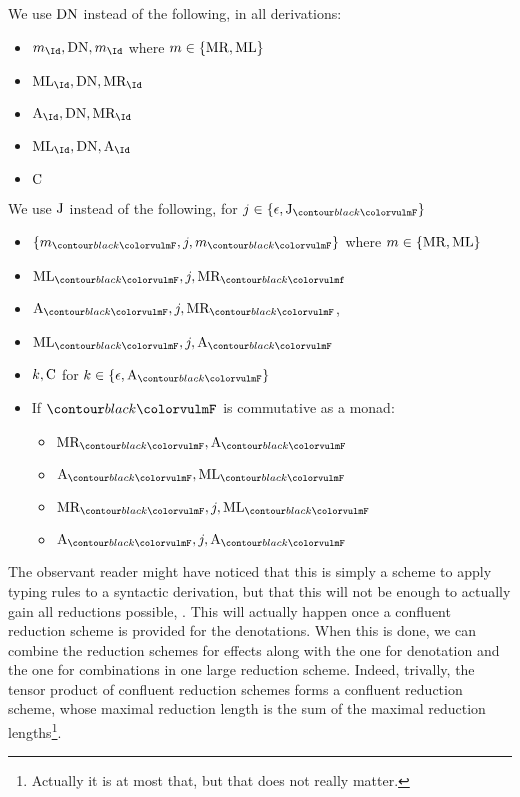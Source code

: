 \noindent We use $\text{DN}$ instead of the following, in all derivations:
\begin{multicols}{2}
	\begin{itemize}
		\item $m_{\Id}, \combDN, m_{\Id}$ where
		      $m \in \{\text{MR}, \text{ML}\}$
		\item $\combML_{\Id}, \combDN, \combMR_{\Id}$
		\item $\combA_{\Id}, \combDN, \combMR_{\Id}$
		\item $\combML_{\Id}, \combDN, \combA_{\Id}$
		\item $\text{C}$
	\end{itemize}
\end{multicols}
\noindent We use $\text{J}$ instead of the following,
for $j \in \{\epsilon, \combJ_{\f{F}}\}$
\begin{multicols}{2}
	\begin{itemize}
		\item $\left\{m_{\f{F}}, j, m_{\f{F}}\right\}$ where
		      $m \in \{\text{MR}, \text{ML}\}$
		\item $\combML_{\f{F}}, j, \combMR_{\f{f}}$
		\item $\combA_{\f{F}}, j, \combMR_{\f{F}}$,
		\item $\combML_{\f{F}}, j, \combA_{\f{F}}$
		\item $k, \text{C}$ for $k \in \{\epsilon, \combA_{\f{F}}\}$
		\item If $\f{F}$ is commutative as a monad:
		      \begin{itemize}
			      \item $\combMR_{\f{F}}, \combA_{\f{F}}$
			      \item $\combA_{\f{F}}, \combML_{\f{F}}$
			      \item $\combMR_{\f{F}}, j, \combML_{\f{F}}$
			      \item $\combA_{\f{F}}, j, \combA_{\f{F}}$
		      \end{itemize}
	\end{itemize}
\end{multicols}

\medskip

The observant reader might have noticed that this is simply a scheme to apply
typing rules to a syntactic derivation, but that this will not be enough to
actually gain all reductions possible, .
This will actually happen once a confluent reduction scheme is provided for the
denotations.
When this is done, we can combine the reduction schemes for effects along with
the one for denotation and the one for combinations in one large reduction
scheme.
Indeed, trivally, the tensor product of confluent reduction schemes forms a
confluent reduction scheme, whose maximal reduction length is the sum of the
maximal reduction lengths\footnote{Actually it is at most that, but that does
	not	really matter.}.
